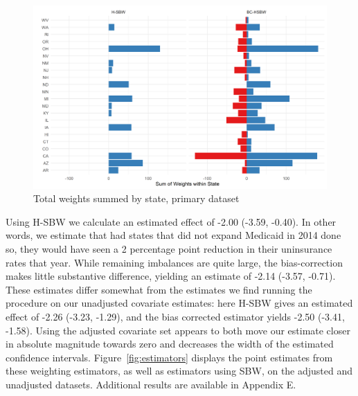 \documentclass[12pt]{article}
\begin{document}
\begin{figure}[B]
\begin{center}
    \includegraphics[scale=0.6]{01_Plots/weights-by-state-hsbw-c1.png}
    \caption{Total weights summed by state, primary dataset}
    \label{fig:statewghts}
\end{center}
\end{figure}

Using H-SBW we calculate an estimated effect of -2.00 (-3.59, -0.40). In other words, we estimate that had states that did not expand Medicaid in 2014 done so, they would have seen a 2 percentage point reduction in their uninsurance rates that year. While remaining imbalances are quite large, the bias-correction makes little substantive difference, yielding an estimate of -2.14 (-3.57, -0.71). These estimates differ somewhat from the estimates we find running the procedure on our unadjusted covariate estimates: here H-SBW gives an estimated effect of -2.26 (-3.23, -1.29), and the bias corrected estimator yields -2.50 (-3.41, -1.58). Using the adjusted covariate set appears to both move our estimate closer in absolute magnitude towards zero and decreases the width of the estimated confidence intervals. Figure~\ref{fig:estimators} displays the point estimates from these weighting estimators, as well as estimators using SBW, on the adjusted and unadjusted datasets. Additional results are available in Appendix E.
\end{document}
